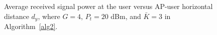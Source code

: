 \documentclass[draftclsnofoot,onecolumn,12pt]{IEEEtran}
\newcommand{\revh}[1]{{\color{black}#1}} %
\newcommand{\revh}[1]{#1}
\begin{document}
\begin{figure}[!t] 
	\centering    
	\revh{\caption{Average received signal power at the user versus AP-user horizontal distance $d_y$, where $G=4$, $P_t=20$ dBm, and ${\bar K}=3$ in Algorithm~\ref{alg2}.}}     
	\label{received pow}     
\end{figure}
\end{document}
